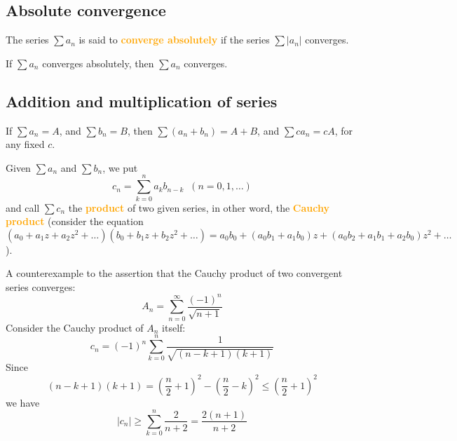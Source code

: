 \subsection{Absolute convergence}

\begin{definition}
[pma 3.45]
The series $\sum a_n$ is said to \textbf{\textcolor{orange}{converge absolutely}} if the series $\sum |a_n|$ converges.
\end{definition}

\begin{theorem}
[pma 3.45]
If $\sum a_n$ converges absolutely, then $\sum a_n$ converges.
\end{theorem}

\subsection{Addition and multiplication of series}

\begin{theorem}
[pma 3.47]
If $\sum a_n=A$, and $\sum b_n=B$, then $\sum (a_n+b_n) = A+B$, and $\sum ca_n = cA$, for any fixed $c$.
\end{theorem}

\begin{definition}
[pma 3.48]
Given $\sum a_n$ and $\sum b_n$, we put
$$ c_n=\sum_{k=0}^{n}a_kb_{n-k}\;\; (n=0,1,\dots)$$
and call $\sum c_n$ the \textbf{\textcolor{orange}{product}} of two given series, in other word, the \textbf{\textcolor{orange}{Cauchy product}}  (consider the equation $(a_0+a_1z+a_2z^2+\dots)(b_0+b_1z+b_2z^2+\dots)=a_0b_0+(a_0b_1+a_1b_0)z+(a_0b_2+a_1b_1+a_2b_0)z^2+\dots$).
\end{definition}

\begin{example}
[pma 3.49]
A counterexample to the assertion that the Cauchy product of two convergent series converges:
$$A_n=\sum_{n=0}^\infty \frac{(-1)^n}{\sqrt{n+1}}$$
Consider the Cauchy product of $A_n$ itself:
$$c_n=(-1)^n\sum_{k=0}^n\frac{1}{\sqrt{(n-k+1)(k+1)}}$$
Since
$$(n-k+1)(k+1)=(\frac{n}{2}+1)^2-(\frac{n}{2}-k)^2\leq (\frac{n}{2}+1)^2$$
we have
$$|c_n|\geq \sum_{k=0}^n \frac{2}{n+2}=\frac{2(n+1)}{n+2}$$
\end{example}

